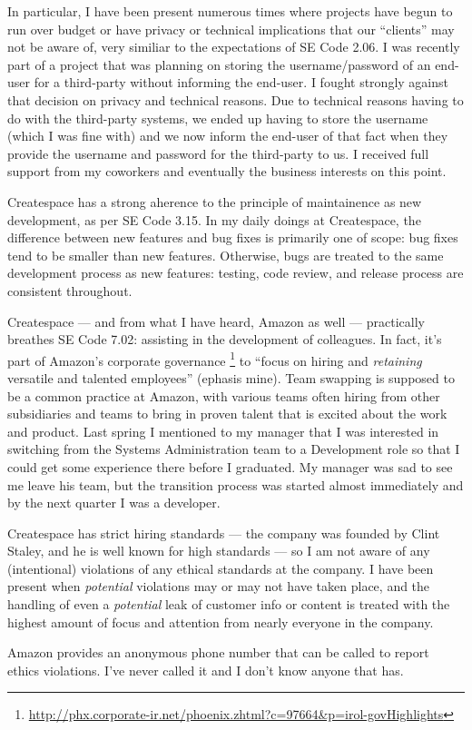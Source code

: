 \documentclass[12pt]{article}
\begin{document}
In particular, I have been present numerous times where projects have begun to run over budget or have privacy or technical implications that our ``clients'' may not be aware of, very similiar to the expectations of SE Code 2.06.  I was recently part of a project that was planning on storing the username/password of an end-user for a third-party without informing the end-user.  I fought strongly against that decision on privacy and technical reasons.  Due to technical reasons having to do with the third-party systems, we ended up having to store the username (which I was fine with) and we now inform the end-user of that fact when they provide the username and password for the third-party to us.  I received full support from my coworkers and eventually the business interests on this point.

Createspace has a strong aherence to the principle of maintainence as new development, as per SE Code 3.15.  In my daily doings at Createspace, the difference between new features and bug fixes is primarily one of scope: bug fixes tend to be smaller than new features.  Otherwise, bugs are treated to the same development process as new features: testing, code review, and release process are consistent throughout.

Createspace --- and from what I have heard, Amazon as well --- practically breathes SE Code 7.02: assisting in the development of colleagues.  In fact, it's part of Amazon's corporate governance \footnote{\url{http://phx.corporate-ir.net/phoenix.zhtml?c=97664&p=irol-govHighlights}} to ``focus on hiring and \emph{retaining} versatile and talented employees'' (ephasis mine).  Team swapping is supposed to be a common practice at Amazon, with various teams often hiring from other subsidiaries and teams to bring in proven talent that is excited about the work and product.  Last spring I mentioned to my manager that I was interested in switching from the Systems Administration team to a Development role so that I could get some experience there before I graduated.  My manager was sad to see me leave his team, but the transition process was started almost immediately and by the next quarter I was a developer.

Createspace has strict hiring standards --- the company was founded by Clint Staley, and he is well known for high standards --- so I am not aware of any (intentional) violations of any ethical standards at the company.  I have been present when \emph{potential} violations may or may not have taken place, and the handling of even a \emph{potential} leak of customer info or content is treated with the highest amount of focus and attention from nearly everyone in the company.

Amazon provides an anonymous phone number that can be called to report ethics violations.  I've never called it and I don't know anyone that has.  
\end{document}
